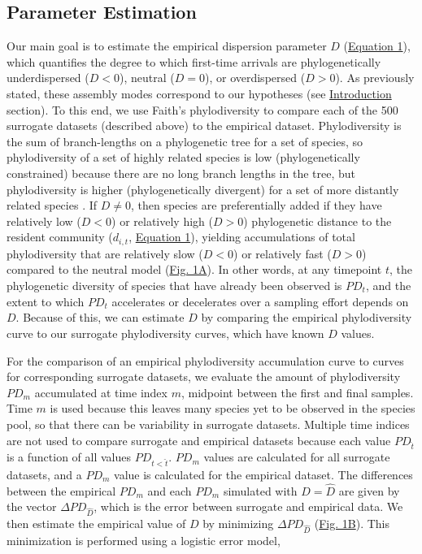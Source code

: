 \documentclass{article}
\begin{document}
\subsection{Parameter Estimation} \label{sec:parameterEstimation}
Our main goal is to estimate the empirical dispersion parameter \(D\) (\hyperref[sec:equation1]{Equation 1}), which quantifies the degree to which first-time arrivals are phylogenetically underdispersed (\(D<0\)), neutral (\(D=0\)), or overdispersed (\(D>0\)). As previously stated, these assembly modes correspond to our hypotheses (see \hyperref[sec:introduction]{Introduction} section). To this end, we use Faith's phylodiversity \cite{Faith1992} to compare each of the 500 surrogate datasets (described above) to the empirical dataset. Phylodiversity is the sum of branch-lengths on a phylogenetic tree for a set of species, so phylodiversity of a set of highly related species is low (phylogenetically constrained) because there are no long branch lengths in the tree, but phylodiversity is higher (phylogenetically divergent) for a set of more distantly related species \cite{Faith1992}. If \(D\neq0\), then species are preferentially added if they have relatively low (\(D<0\)) or relatively high (\(D>0\)) phylogenetic distance to the resident community (\(d_{i,t}\), \hyperref[sec:equation1]{Equation 1}), yielding accumulations of total phylodiversity that are relatively slow (\(D<0\)) or relatively fast (\(D>0\)) compared to the neutral model (\hyperref[sec:figure1]{Fig. 1A}). In other words, at any timepoint \(t\), the phylogenetic diversity of species that have already been observed is \(PD_t\), and the extent to which \(PD_t\) accelerates or decelerates over a sampling effort depends on \(D\). Because of this, we can estimate \(D\) by comparing the empirical phylodiversity curve to our surrogate phylodiversity curves, which have known \(\hat{D}\) values.
 \par
For the comparison of an empirical phylodiversity accumulation curve to curves for corresponding surrogate datasets, we evaluate the amount of phylodiversity \(PD_m\) accumulated at time index \(m\), midpoint between the first and final samples. Time \(m\) is used because this leaves many species yet to be observed in the species pool, so that there can be variability in surrogate datasets. Multiple time indices are not used to compare surrogate and empirical datasets because each value \(PD_{\hat{t}}\) is a function of all values \(PD_{t<\hat{t}}\). \(PD_m\) values are calculated for all surrogate datasets, and a \(PD_m\) value is calculated for the empirical dataset. The differences between the empirical \(PD_m\) and each \(PD_m\) simulated with \(D=\hat{D}\) are given by the vector \(\Delta PD_{\hat{D}}\), which is the error between surrogate and empirical data. We then estimate the empirical value of \(D\) by minimizing \(\Delta PD_{\hat{D}}\) (\hyperref[sec:figure1]{Fig. 1B}). This minimization is performed using a logistic error model,
\end{document}
